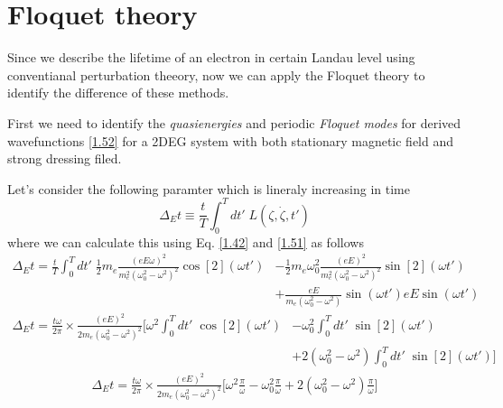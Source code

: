 \section{Floquet theory}

Since we describe the lifetime of an electron in certain Landau level using conventianal perturbation theeory, now we can apply the Floquet theory to identify the difference of these methods.

\noindent
First we need to identify the \textit{quasienergies} and periodic \textit{Floquet modes} for derived wavefunctions \eqref{1.52} for a 2DEG system with both stationary magnetic field and strong dressing filed.

\noindent
Let's consider the following paramter which is lineraly increasing in time
\begin{equation} \label{3.1}
  \Delta_E t \equiv \frac{t}{T} \int_0^T dt' \; L(\zeta,\dot{\zeta},t')
\end{equation}
where we can calculate this using Eq. \eqref{1.42} and \eqref{1.51} as follows
\begin{equation} \label{3.2}
  \begin{aligned}
    \Delta_E t =
    \frac{t}{T} \int_0^T dt' \;
    \frac{1}{2}m_e \frac{(eE\omega)^2}{m_e^2(\omega_0^2 - \omega^2)^2} \cos[2](\omega t')
    & - \frac{1}{2}m_e\omega_0^2 \frac{(eE)^2}{m_e^2(\omega_0^2 - \omega^2)^2} \sin[2](\omega t') \\
    & +
    \frac{eE}{m_e(\omega_0^2 - \omega^2)} \sin(\omega t') eE \sin(\omega t')
  \end{aligned}
\end{equation}
\begin{equation} \label{3.3}
  \begin{aligned}
    \Delta_E t  =
    \frac{t\omega}{2\pi} \times
    \frac{(eE)^2}{2m_e(\omega_0^2 - \omega^2)^2}
    \bigg[
    \omega^2
    \int_0^T dt' \; \cos[2](\omega t')
    & -
    \omega_0^2
    \int_0^T dt'\; \sin[2](\omega t') \\
    & +
    2(\omega_0^2 - \omega^2) \int_0^T dt'\; \sin[2](\omega t')
    \bigg]
  \end{aligned}
\end{equation}
\begin{equation} \label{3.4}
  \begin{aligned}
    \Delta_E t  =
    \frac{t\omega}{2\pi} \times
    \frac{(eE)^2}{2m_e(\omega_0^2 - \omega^2)^2}
    \bigg[
    \omega^2
    \frac{\pi}{\omega}
    -
    \omega_0^2
    \frac{\pi}{\omega}
    +
    2(\omega_0^2 - \omega^2) \frac{\pi}{\omega}
    \bigg]
  \end{aligned}
\end{equation}
